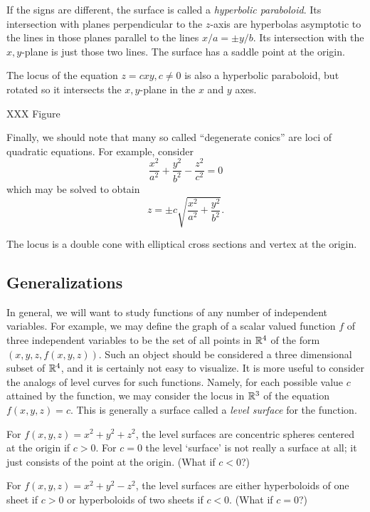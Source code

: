 If the signs are different, the surface is called a {\it
hyperbolic paraboloid}.  Its intersection with planes perpendicular
to the $z$-axis are hyperbolas asymptotic to the lines in
those planes parallel to the lines $x/a = \pm y/b$.   Its intersection
with the $x,y$-plane is just those two lines.  The surface has
a saddle point at the origin.


The locus of the equation $z = cxy, c\not= 0$ is also a hyperbolic
paraboloid, but rotated so it intersects the $x,y$-plane in the
$x$ and $y$ axes. 

XXX Figure

Finally, we should note that many so called ``degenerate conics''
are loci of quadratic equations.   For example, consider
\[
    \frac{x^2}{a^2} + \frac{y^2}{b^2} - \frac{z^2}{c^2} = 0
\]
which may be solved to obtain
\[
   z = \pm c\sqrt{\frac{x^2}{a^2} + \frac{y^2}{b^2}}. 
\]

The locus is a double cone with elliptical cross sections and
vertex at the origin.  

\subsection{Generalizations}
In general, we will want to study functions of any number of independent
variables.   For example, we may define the graph of a scalar valued
function $f$ of three independent variables to be the set of all points
in $\mathbb{R}^4$ of the form $(x,y,z,f(x,y,z))$.   Such an object
should be considered a three dimensional subset of $\mathbb{R}^4$, and it is
certainly not easy to visualize.  It is more useful to consider the
analogs of level curves for such functions.  Namely, for each
possible value $c$ attained by the function, we may consider the
locus in $\mathbb{R}^3$ of the equation $f(x,y,z) = c$.  This is generally
a surface called a \emph{level surface} for the function. 

\begin{example}
For $f(x, y, z) = x^2 + y^2 + z^2$, the level surfaces are
concentric spheres centered at the origin if $c > 0$.   For
$c = 0$ the level `surface' is not really a surface at all; it
just consists of the point at the origin.   (What if $c < 0$?) 

For $f(x,y,z) = x^2 + y^2 - z^2$, the level surfaces are either
hyperboloids of one sheet if $c > 0$ or hyperboloids of two sheets
if $c < 0$.  (What if $c = 0$?)
\end{example}

